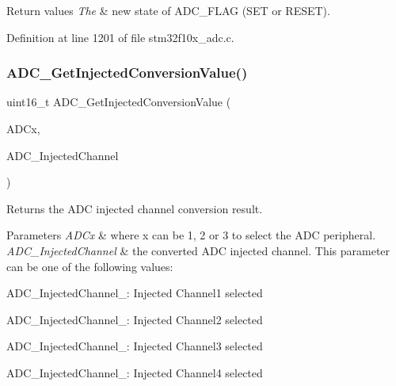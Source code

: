 \begin{DoxyRetVals}{Return values}
{\em The} & new state of A\+D\+C\+\_\+\+F\+L\+AG (S\+ET or R\+E\+S\+ET). \\
\hline
\end{DoxyRetVals}


Definition at line 1201 of file stm32f10x\+\_\+adc.\+c.

\mbox{\label{group___a_d_c___private___functions_ga1dea5ed24571a2e0ce4cbd41c9c1ec46}} 
\subsubsection{\texorpdfstring{A\+D\+C\+\_\+\+Get\+Injected\+Conversion\+Value()}{ADC\_GetInjectedConversionValue()}}
{\footnotesize\ttfamily uint16\+\_\+t A\+D\+C\+\_\+\+Get\+Injected\+Conversion\+Value (\begin{DoxyParamCaption}\item[{\hyperlink{struct_a_d_c___type_def}{A\+D\+C\+\_\+\+Type\+Def} $\ast$}]{A\+D\+Cx,  }\item[{uint8\+\_\+t}]{A\+D\+C\+\_\+\+Injected\+Channel }\end{DoxyParamCaption})}



Returns the A\+DC injected channel conversion result. 


\begin{DoxyParams}{Parameters}
{\em A\+D\+Cx} & where x can be 1, 2 or 3 to select the A\+DC peripheral. \\
\hline
{\em A\+D\+C\+\_\+\+Injected\+Channel} & the converted A\+DC injected channel. This parameter can be one of the following values\+: \begin{DoxyItemize}
\item A\+D\+C\+\_\+\+Injected\+Channel\+\_\+: Injected Channel1 selected \item A\+D\+C\+\_\+\+Injected\+Channel\+\_\+: Injected Channel2 selected \item A\+D\+C\+\_\+\+Injected\+Channel\+\_\+: Injected Channel3 selected \item A\+D\+C\+\_\+\+Injected\+Channel\+\_\+: Injected Channel4 selected \end{DoxyItemize}
\\
\hline
\end{DoxyParams}

